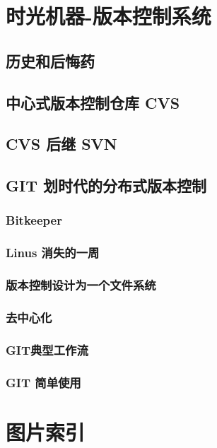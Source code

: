 \documentclass[amstex,twoside]{ctexbook}
\begin{document}
\ifdefined\compileall

\else
\addtocounter{chapter}{1}
\fi


\chapter{时光机器-版本控制系统}\label{chap:VCS}
\section{   历史和后悔药	}
\section{   中心式版本控制仓库 CVS	}
\section{   CVS 后继 SVN	}
\section{GIT 划时代的分布式版本控制\label{sec:git}}
\subsection{  Bitkeeper	}
\subsection{  Linus 消失的一周	}
\subsection{  版本控制设计为一个文件系统	}
\subsection{ 去中心化	}
\subsection{  GIT典型工作流	}
\subsection{  GIT 简单使用	}


\appendix

{  }


{  }




\chapter{图片索引}
{
\renewcommand{\cleardoublepage}{}

\renewcommand\listfigurename{}
\vskip -3cm
\listoffigures 
}


\ifdefined\compileall

\else
\addtocounter{chapter}{1}
\fi
\end{document}
